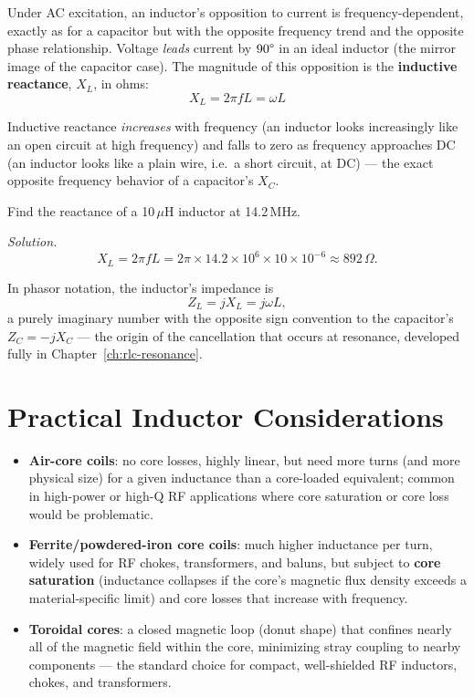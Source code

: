 Under AC excitation, an inductor's opposition to current is
frequency-dependent, exactly as for a capacitor but with the opposite
frequency trend and the opposite phase relationship. Voltage \emph{leads}
current by $90\degree$ in an ideal inductor (the mirror image of the
capacitor case). The magnitude of this opposition is the
\textbf{inductive reactance}, $X_L$, in ohms:
\[
\boxed{X_L = 2\pi f L = \omega L}
\]

\begin{keyidea}
Inductive reactance \emph{increases} with frequency (an inductor looks
increasingly like an open circuit at high frequency) and falls to zero
as frequency approaches DC (an inductor looks like a plain wire, i.e.\ a
short circuit, at DC) --- the exact opposite frequency behavior of a
capacitor's $X_C$.
\end{keyidea}

\begin{examplebox}
Find the reactance of a 10\,$\mu$H inductor at 14.2\,MHz.

\emph{Solution.}
\[
X_L = 2\pi f L = 2\pi \times 14.2\times10^{6} \times 10\times10^{-6} \approx 892\,\Omega.
\]
\end{examplebox}

In phasor notation, the inductor's impedance is
\[
Z_L = jX_L = j\omega L,
\]
a purely imaginary number with the opposite sign convention to the
capacitor's $Z_C = -jX_C$ --- the origin of the cancellation that occurs
at resonance, developed fully in Chapter~\ref{ch:rlc-resonance}.

\section{Practical Inductor Considerations}

\begin{itemize}
\item \textbf{Air-core coils}: no core losses, highly linear, but need
more turns (and more physical size) for a given inductance than a
core-loaded equivalent; common in high-power or high-Q RF applications
where core saturation or core loss would be problematic.
\item \textbf{Ferrite/powdered-iron core coils}: much higher inductance
per turn, widely used for RF chokes, transformers, and baluns, but
subject to \textbf{core saturation} (inductance collapses if the core's
magnetic flux density exceeds a material-specific limit) and core losses
that increase with frequency.
\item \textbf{Toroidal cores}: a closed magnetic loop (donut shape) that
confines nearly all of the magnetic field within the core, minimizing
stray coupling to nearby components --- the standard choice for compact,
well-shielded RF inductors, chokes, and transformers.
\end{itemize}

